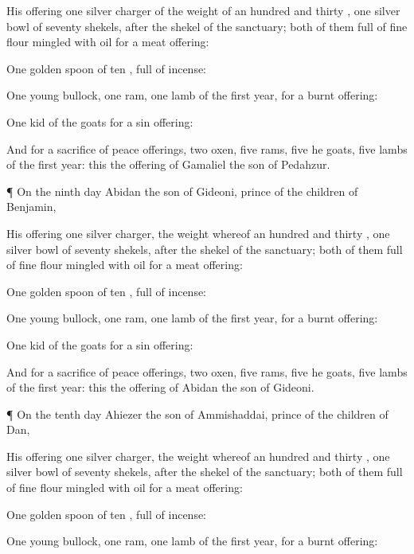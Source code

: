 {His
offering
{}
one
silver
charger of the
weight of an
hundred and
thirty
{},
one
silver
bowl of
seventy
shekels, after the
shekel of the
sanctuary;
both of them
full of fine
flour
mingled with
oil for a meat
offering:

One
golden
spoon of
ten
{},
full of
incense:

One
young
bullock,
one
ram,
one
lamb of the
first
year, for a burnt
offering:

One
kid of the
goats for a sin
offering:

And for a
sacrifice of peace
offerings,
two
oxen,
five
rams,
five he
goats,
five
lambs of the
first
year: this
{} the
offering of
Gamaliel the
son of
Pedahzur.


\par }{\PP {}¶ On the
ninth
day
Abidan the
son of
Gideoni,
prince of the
children of
Benjamin,
{}

His
offering
{}
one
silver
charger, the
weight whereof
{} an
hundred and
thirty
{},
one
silver
bowl of
seventy
shekels, after the
shekel of the
sanctuary;
both of them
full of fine
flour
mingled with
oil for a meat
offering:

One
golden
spoon of
ten
{},
full of
incense:

One
young
bullock,
one
ram,
one
lamb of the
first
year, for a burnt
offering:

One
kid of the
goats for a sin
offering:

And for a
sacrifice of peace
offerings,
two
oxen,
five
rams,
five he
goats,
five
lambs of the
first
year: this
{} the
offering of
Abidan the
son of
Gideoni.


\par }{\PP {}¶ On the
tenth
day
Ahiezer the
son of
Ammishaddai,
prince of the
children of
Dan,
{}

His
offering
{}
one
silver
charger, the
weight whereof
{} an
hundred and
thirty
{},
one
silver
bowl of
seventy
shekels, after the
shekel of the
sanctuary;
both of them
full of fine
flour
mingled with
oil for a meat
offering:

One
golden
spoon of
ten
{},
full of
incense:

One
young
bullock,
one
ram,
one
lamb of the
first
year, for a burnt
offering:

}
